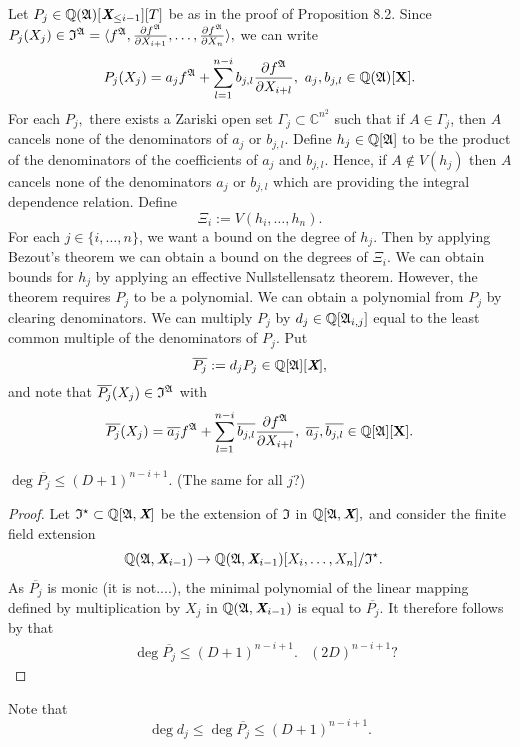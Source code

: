 \documentclass[sigconf]{acmart}
\def\Xb{\textit{\textbf{X}}}
\def\ajb{\overline{a_j}}
\def\bjb{\overline{b_{j,l}}}
\def\pjb{\overline{P_{j}}}
\def\C{\mathbb{C}}
\def\Q{\mathbb{Q}}
\def\I{\frak{I}}
\def\Is{\frak{I}^{\star}}
\def\A{\frak{A}}
\begin{document}
%
Let $P_{j} \in \mathbb{Q}(\frak{A})[\Xb_{\leq i-1}][T]$ be as in the proof of Proposition 8.2. Since $P_{j}(X_j) \in\I^{\A}= \langle f^\A,\frac{\partial f^\A}{\partial X_{i+1}},\hdots,\frac{\partial f^\A}{\partial X_n} \rangle,$
 we can write
\[
P_{j}(X_j) = a_j f^{\A} + \sum_{l=1}^{n-i}b_{j,l} \frac{\partial f^\A}{\partial X_{i+l}}, ~a_j,b_{j,l} \in \mathbb{Q}(\A)[\textbf{X}].
\]
For each $P_j,$ there exists a Zariski open set $\Gamma_j \subset \C^{n^2}$ such that if $A \in \Gamma_j$,
then $A$ cancels none of the denominators of $a_{j}$ or $b_{j,l}$. Define $h_j \in \Q[\A]$ to be the product of the denominators of the coefficients of $a_j$ and $b_{j,l}$. Hence, if $A \not \in V(h_j)$ then $A$ cancels none of the denominators $a_{j}$ or $b_{j,l}$ which are providing the integral dependence relation. Define
\[
\Xi_i := V(h_i,\hdots,h_n).
\]
For each $j \in \{i,\hdots,n\}$, we want a bound on the degree of $h_j$. Then by applying Bezout's theorem we can obtain a bound on the degrees of $\Xi_i$. We can obtain bounds for $h_j$ by applying an effective Nullstellensatz theorem. However, the theorem requires $P_{j}$ to be a polynomial. We can obtain a polynomial from $P_{j}$ by clearing denominators. We can multiply $P_{j}$ by $d_j \in \Q[\A_{i,j}]$ equal to the least common multiple of the denominators of $P_{j}.$ Put 
\[
\overline{P_{j}} := d_jP_{j}\in \Q[\A][\textit{\textbf{X}}],
\]
and note that $\pjb(X_j) \in \I^{\A}$ with 
\[
\pjb(X_j) = \ajb f^{\A} + \sum_{l=1}^{n-i}\bjb \frac{\partial f^\A}{\partial X_{i+l}}, ~\ajb,\bjb \in \mathbb{Q}[\A][\textbf{X}].
\]
%
\begin{proposition} 
$\deg \pjb\leq (D+1)^{n-i+1}.$ (The same for all $j$?)
\end{proposition} 
%
\begin{proof}
Let $\Is \subset \Q[\A,\Xb]$ be the extension of $\I$ in  $\Q[\A,\Xb],$ and consider the finite field extension
%
\begin{align*}
    \Q(\A,\Xb_{i-1}) &\rightarrow \Q(\A,\Xb_{i-1})[X_i,\hdots,X_n]/\Is.
\end{align*}
%
As $\pjb$ is monic (it is not....), the minimal polynomial of the linear mapping defined by multiplication by $X_j$ in $\Q(\A,\Xb_{i-1})$ is equal to $\pjb$. It therefore follows by \cite[Proposition 1]{CGR} that
%
\begin{align*}
&\deg \pjb \leq (D+1)^{n-i+1}.&(2D)^{n-i+1}\textrm{?} 
\end{align*}
%
\end{proof}
%
Note that 
\[
\deg d_j \leq \deg \pjb \leq (D+1)^{n-i+1}.
\]
%
\end{document}
